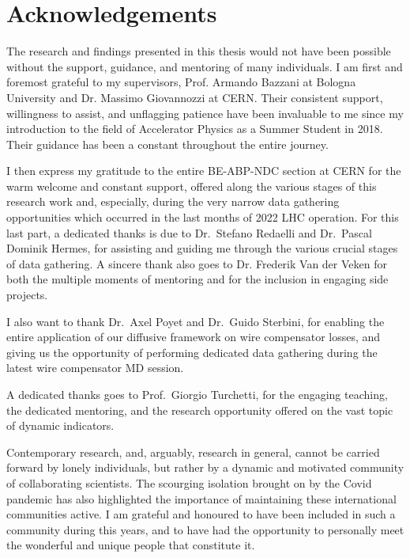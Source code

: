 \chapter*{Acknowledgements}
\sectionmark{}


The research and findings presented in this thesis would not have been possible without the support, guidance, and mentoring of many individuals. I am first and foremost grateful to my supervisors, Prof. Armando Bazzani at Bologna University and Dr. Massimo Giovannozzi at CERN. Their consistent support, willingness to assist, and unflagging patience have been invaluable to me since my introduction to the field of Accelerator Physics as a Summer Student in 2018. Their guidance has been a constant throughout the entire journey.

I then express my gratitude to the entire BE-ABP-NDC section at CERN for the warm welcome and constant support, offered along the various stages of this research work and, especially, during the very narrow data gathering opportunities which occurred in the last months of 2022 LHC operation. For this last part, a dedicated thanks is due to Dr.\ Stefano Redaelli and Dr.\ Pascal Dominik Hermes, for assisting and guiding me through the various crucial stages of data gathering. A sincere thank also goes to Dr. Frederik Van der Veken for both the multiple moments of mentoring and for the inclusion in engaging side projects. 

I also want to thank Dr.\ Axel Poyet and Dr.\ Guido Sterbini, for enabling the entire application of our diffusive framework on wire compensator losses, and giving us the opportunity of performing dedicated data gathering during the latest wire compensator MD session.

A dedicated thanks goes to Prof.\ Giorgio Turchetti, for the engaging teaching, the dedicated mentoring, and the research opportunity offered on the vast topic of dynamic indicators.

Contemporary research, and, arguably, research in general, cannot be carried forward by lonely individuals, but rather by a dynamic and motivated community of collaborating scientists. The scourging isolation brought on by the Covid pandemic has also highlighted the importance of maintaining these international communities active. I am grateful and honoured to have been included in such a community during this years, and to have had the opportunity to personally meet the wonderful and unique people that constitute it.

